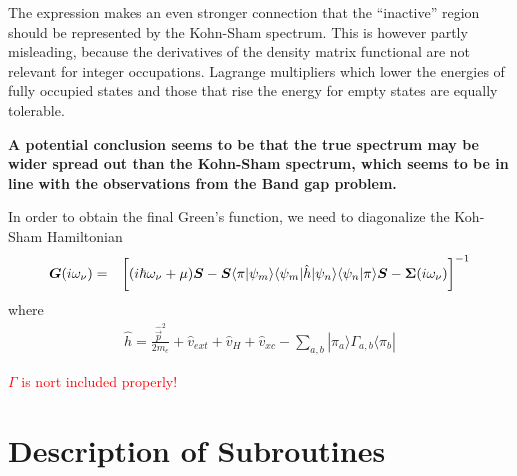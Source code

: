 \documentclass[11pt,a4paper]{report}
\begin{document}
The expression  makes an even stronger connection that
the ``inactive'' region should be represented by the Kohn-Sham
spectrum. This is however partly misleading, because the derivatives
of the density matrix functional are not relevant for integer
occupations. Lagrange multipliers which lower the energies of fully
occupied states and those that rise the energy for empty states are
equally tolerable.

\textbf{A potential conclusion seems to be that the true spectrum may
  be wider spread out than the Kohn-Sham spectrum, which seems to be
  in line with the observations from the Band gap problem.}


In order to obtain the final Green's function, we need to diagonalize
the Koh-Sham Hamiltonian 
\begin{eqnarray}
\bm{G}(i\omega_\nu)&=&\biggl[
(i\hbar\omega_\nu+\mu)\bm{S}
-\bm{S}\langle\pi|\psi_m\rangle\langle\psi_m|\hat{h}|\psi_n\rangle
\langle\psi_n|\pi\rangle\bm{S}-\bm{\Sigma}(i\omega_\nu)\biggr]^{-1}
\end{eqnarray}
where
\begin{eqnarray}
\hat{h}=\frac{\hat{\vec{p}}^2}{2m_e}+\hat{v}_{ext}+\hat{v}_{H}+\hat{v}_{xc}
-\sum_{a,b}|\pi_a\rangle \Gamma_{a,b}\langle\pi_b|
\end{eqnarray}

\textcolor{red}{$\Gamma$ is nort included properly!}

\section{Description of Subroutines}


\end{document}
